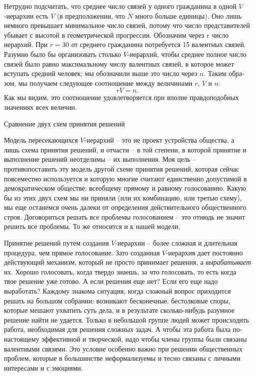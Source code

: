 \documentclass{book}
\begin{document}
Нетрудно подсчитать, что среднее число связей у одного гражданина в одной $V$-иерар\-хии есть $V$ (в предположении, что $N$ много больше единицы).%
Оно лишь немного превышает мини­мальное число связей, потому что число представителей убывает с высотой в геометрической прогрессии. Обозначим через r  число иерархий. При $r= 30$  от среднего гражданина потребуется 15 валент­ных связей. Разумно было бы организовать столько $V$-иерар­хий, чтобы среднее полное число связей было равно максималь­ному числу валентных связей, в которое может вступать средний человек; мы обозначили выше это число через $n$.  Таким обра­зом, мы получаем следующее соотношение между величинами $r$, $V$ и $n$: 
\[
	rV=n.
\]
Как мы видим, это соотношение удовлетворяется при вполне правдоподобных значениях всех величин.

Сравнение двух схем принятия решений

Модель пересекающихся $V$-иерархий -- это не проект устройст­ва общества, а лишь схема принятия решений, и отчасти -- в той степени, в которой принятие и выполнение решений неотделимы -- их выполнения. Моя цель -- противопоставить эту мо­дель другой схеме принятия решений, которая сейчас повсеместно используется и которую многие считают единственно допустимой в демократическом обществе: всеобщему прямому и равному голосованию. Какую бы из этих двух схем мы ни приняли (или их комбинацию, или третью схему), мы еще останемся очень далеки от определения действительного общественного строя. Договориться решать все проблемы голосованием -- это отнюдь не значит решить все проблемы. То же относится и к нашей мо­дели.

Принятие решений путем создания $V$-иерархии -- более слож­ная и длительная процедура, чем прямое голосование. Зато со­зданная $V$-иерархия дает постоянно действующий механизм, ко­торый не просто принимает решения, а \textit{вырабатывает}  их. Хорошо голосовать, когда твердо знаешь, за что голосовать, то есть когда твое решение уже готово. А если решения еще нет? Если его еще надо выработать? Каждому знакома ситуация, когда сложный вопрос приходится решать на большом собрании: возникают бесконечные, бестолковые споры, которые мешают ухватить суть дела, и в результате сколько-нибудь разумное решение най­ти не удается. Только в небольшой группе людей может проис­ходить работа, необходимая для решения сложных задач. А что­бы эта работа была по-настоящему эффективной и творческой, надо чтобы члены группы были связаны валентными связями. Это условие особенно важно при решении общественных проб­лем, которые в большинстве неформализуемы и тесно связаны с личными интересами и с эмоциями.
\end{document}
